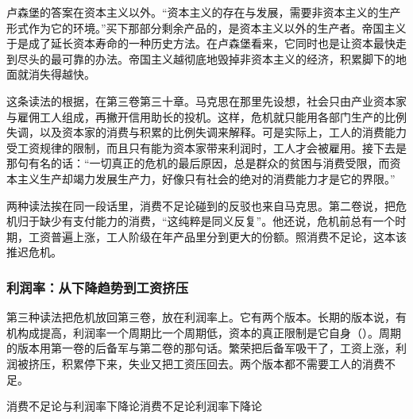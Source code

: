 卢森堡的答案在资本主义以外。“资本主义的存在与发展，需要非资本主义的生产形式作为它的环境。”\cite{luxemburg1913}买下那部分剩余产品的，是资本主义以外的生产者。帝国主义于是成了延长资本寿命的一种历史方法。在卢森堡看来，它同时也是让资本最快走到尽头的最可靠的办法\cite{luxemburg1913}。帝国主义越彻底地毁掉非资本主义的经济，积累脚下的地面就消失得越快\cite{luxemburg1913}。

这条读法的根据，在第三卷第三十章。马克思在那里先设想，社会只由产业资本家与雇佣工人组成，再撇开信用助长的投机。这样，危机就只能用各部门生产的比例失调，以及资本家的消费与积累的比例失调来解释\cite{marx1894}。可是实际上，工人的消费能力受工资规律的限制，而且只有能为资本家带来利润时，工人才会被雇用\cite{marx1894}。接下去是那句有名的话：“一切真正的危机的最后原因，总是群众的贫困与消费受限，而资本主义生产却竭力发展生产力，好像只有社会的绝对的消费能力才是它的界限。”\cite{marx1894}

两种读法挨在同一段话里，消费不足论碰到的反驳也来自马克思。第二卷说，把危机归于缺少有支付能力的消费，“这纯粹是同义反复”\cite{marx1885}。他还说，危机前总有一个时期，工资普遍上涨，工人阶级在年产品里分到更大的份额\cite{marx1909k2}。照消费不足论，这本该推迟危机。

\subsubsection{利润率：从下降趋势到工资挤压}
第三种读法把危机放回第三卷，放在利润率上。它有两个版本。长期的版本说，有机构成提高，利润率一个周期比一个周期低，资本的真正限制是它自身（）。周期的版本用第一卷的后备军与第二卷的那句话。繁荣把后备军吸干了，工资上涨，利润被挤压，积累停下来，失业又把工资压回去。两个版本都不需要工人的消费不足。

\begin{compare}{消费不足论与利润率下降论}{消费不足论}{利润率下降论}
\end{compare}

